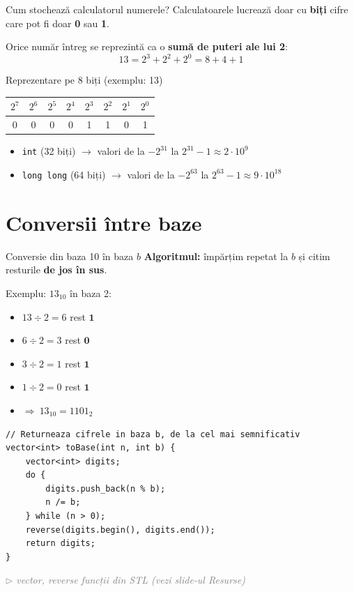 \documentclass{beamer}
\newcommand{\beginnote}[1]{%
  \vfill
  {\footnotesize\textcolor{gray}{\textit{$\triangleright$ #1 (vezi slide-ul \emph{Resurse})}}}%
}
\begin{document}
\begin{frame}[fragile]{Cum stochează calculatorul numerele?}
  Calculatoarele lucrează doar cu \textbf{biți} \textemdash{} cifre care pot fi doar \textbf{0} sau \textbf{1}.
  \bigskip

  Orice număr întreg se reprezintă ca o \textbf{sumă de puteri ale lui 2}:
  \[
    13 = 2^3 + 2^2 + 2^0 = 8 + 4 + 1
  \]

  \begin{block}{Reprezentare pe 8 biți (exemplu: 13)}
    \begin{center}
    \begin{tabular}{|c|c|c|c|c|c|c|c|}
      \hline
      $2^7$ & $2^6$ & $2^5$ & $2^4$ & $2^3$ & $2^2$ & $2^1$ & $2^0$ \\
      \hline
      0 & 0 & 0 & 0 & 1 & 1 & 0 & 1 \\
      \hline
    \end{tabular}
    \end{center}
  \end{block}
  \medskip
  \begin{itemize}
    \item \lstinline|int| (32 biți) $\rightarrow$ valori de la $-2^{31}$ la $2^{31}-1 \approx 2 \cdot 10^9$
    \item \lstinline|long long| (64 biți) $\rightarrow$ valori de la $-2^{63}$ la $2^{63}-1 \approx 9 \cdot 10^{18}$
  \end{itemize}
\end{frame}

\section{Conversii între baze}

\begin{frame}{Conversie din baza 10 în baza $b$}
  \textbf{Algoritmul:} împărțim repetat la $b$ și citim resturile \textbf{de jos în sus}.
  \medskip

  Exemplu: $13_{10}$ în baza 2:
  \begin{itemize}
    \item $13 \div 2 = 6$ rest $\mathbf{1}$
    \item $6 \div 2 = 3$ rest $\mathbf{0}$
    \item $3 \div 2 = 1$ rest $\mathbf{1}$
    \item $1 \div 2 = 0$ rest $\mathbf{1}$
    \item $\Rightarrow\ 13_{10} = 1101_2$
  \end{itemize}
  \begin{center}
  \begin{lstlisting}
// Returneaza cifrele in baza b, de la cel mai semnificativ
vector<int> toBase(int n, int b) {
    vector<int> digits;
    do {
        digits.push_back(n % b);
        n /= b;
    } while (n > 0);
    reverse(digits.begin(), digits.end());
    return digits;
}
  \end{lstlisting}
  \end{center}
  \beginnote{vector, reverse \textemdash{} funcții din STL}
\end{frame}
\end{document}
